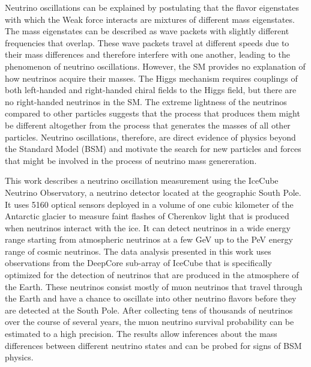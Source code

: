Neutrino oscillations can be explained by postulating that the flavor eigenstates with which the Weak force interacts are mixtures of different mass eigenstates. The mass eigenstates can be described as wave packets with slightly different frequencies that overlap. These wave packets travel at different speeds due to their mass differences and therefore interfere with one another, leading to the phenomenon of neutrino oscillations. However, the SM provides no explanation of how neutrinos acquire their masses. The Higgs mechanism requires couplings of both left-handed and right-handed chiral fields to the Higgs field, but there are no right-handed neutrinos in the SM. The extreme lightness of the neutrinos compared to other particles suggests that the process that produces them might be different altogether from the process that generates the masses of all other particles. Neutrino oscillations, therefore, are direct evidence of physics beyond the Standard Model (BSM) and motivate the search for new particles and forces that might be involved in the process of neutrino mass genereration.

This work describes a neutrino oscillation measurement using the IceCube Neutrino Observatory, a neutrino detector located at the geographic South Pole. It uses 5160 optical sensors deployed in a volume of one cubic kilometer of the Antarctic glacier to measure faint flashes of Cherenkov light that is produced when neutrinos interact with the ice. It can detect neutrinos in a wide energy range starting from atmospheric neutrinos at a few GeV up to the PeV energy range of cosmic neutrinos. The data analysis presented in this work uses observations from the DeepCore sub-array of IceCube that is specifically optimized for the detection of neutrinos that are produced in the atmosphere of the Earth. These neutrinos consist mostly of muon neutrinos that travel through the Earth and have a chance to oscillate into other neutrino flavors before they are detected at the South Pole. After collecting tens of thousands of neutrinos over the course of several years, the muon neutrino survival probability can be estimated to a high precision. The results allow inferences about the mass differences between different neutrino states and can be probed for signs of BSM physics.

